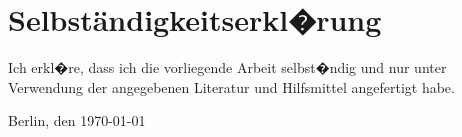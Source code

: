 \chapter*{Selbständigkeitserkl�rung}
Ich erkl�re, dass ich die vorliegende Arbeit selbst�ndig und nur unter Verwendung der angegebenen Literatur und Hilfsmittel angefertigt habe.

\vspace{2\baselineskip}
\noindent Berlin, den \today\hfill\authorfirstname \authorsurname
{}
